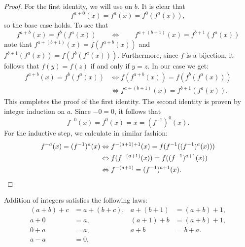 \begin{proof}
  For the first identity, we will use  on $b$. It is clear that
  \begin{equation*}
    f^{a+0}(x)=f^a(x)=f^0(f^a(x)),
  \end{equation*}
  so the base case holds. To see that
  \begin{equation*}
    f^{a+b}(x)=f^b(f^a(x)) \qquad\Leftrightarrow\qquad f^{a+(b+1)}(x)=f^{b+1}(f^a(x))
  \end{equation*}
  note that $f^{a+(b+1)}(x)=f(f^{a+b}(x))$ and $f^{b+1}(f^a(x))=f(f^b(f^a(x)))$. Furthermore, since $f$ is a bijection, it follows that $f(y)=f(z)$ if and only if $y=z$. In our case we get:
  \begin{align*}
    f^{a+b}(x)=f^b(f^a(x)) & \Leftrightarrow f(f^{a+b}(x))=f(f^b(f^a(x))) \\
                           & \Leftrightarrow f^{a+(b+1)}(x)=f^{b+1}(f^a(x)).
  \end{align*}
  This completes the proof of the first identity. The second identity is proven by integer induction on $a$. Since $-0=0$, it follows that
  \begin{equation*}
    f^{-0}(x) = f^0(x)=x=(f^{-1})^0(x).
  \end{equation*}
  For the inductive step, we calculate in similar fashion:
  \begin{align*}
    f^{-a}(x)=(f^{-1})^a(x) & \Leftrightarrow f^{-(a+1)+1}(x) = f(f^{-1}((f^{-1})^a(x))) \\
    & \Leftrightarrow f(f^{-(a+1)}(x)) = f((f^{-1})^{a+1}(x)) \\
    & \Leftrightarrow f^{-(a+1)}=(f^{-1})^{a+1}(x). \qedhere
  \end{align*}
\end{proof}

\begin{theorem}
  Addition of integers satisfies the following laws:
  \begin{align*}
    (a+b)+c & = a+(b+c), & a+(b+1) & = (a+b)+1, \\
    a+0 & = a, & (a+1)+b & = (a+b)+1, \\
    0+a & = a, & a+b & = b+a. \\
    a-a & = 0,
  \end{align*}
\end{theorem}

